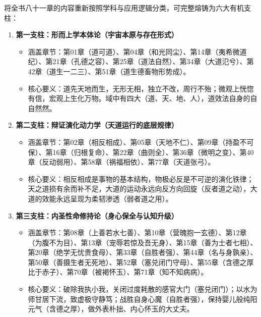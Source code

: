 将全书八十一章的内容重新按照学科与应用逻辑分类，可完整熔铸为六大有机支柱：

\begin{enumerate}
    \item \textbf{第一支柱：形而上学本体论（宇宙本原与存在形式）}
    \begin{itemize}
        \item 涵盖章节：第01章（道可道）、第04章（和光同尘）、第14章（夷希微道纪）、第21章（孔德之容）、第25章（道法自然）、第34章（大道氾兮）、第42章（道生一二三）、第51章（道生德畜物形势成）。
        \item 核心要义：道先天地而生，无形无相，独立不改，周行不殆；微观上恍惚有信，宏观上生化万物。域中有四大（道、天、地、人），道效法自身的自自然然。
    \end{itemize}

    \item \textbf{第二支柱：辩证演化动力学（天道运行的底层规律）}
    \begin{itemize}
        \item 涵盖章节：第02章（相反相成）、第05章（天地不仁）、第09章（持盈不可保）、第16章（归根复命）、第22章（曲则全）、第36章（微明之变）、第40章（反动弱用）、第58章（祸福相依）、第77章（天道张弓）。
        \item 核心要义：相反相成是事物的基本结构，物极必反是不可逆的演化铁律；天之道损有余而补不足，大道的运动永远向反方向回旋（反者道之动），大道的效能永远呈现为柔韧渗透（弱者道之用）。
    \end{itemize}

    \item \textbf{第三支柱：内圣性命修持论（身心保全与认知升级）}
    \begin{itemize}
        \item 涵盖章节：第08章（上善若水七善）、第10章（营魄抱一玄德）、第12章（为腹不为目）、第13章（宠辱若惊及吾无身）、第15章（善为士者七相）、第20章（绝学无忧贵食母）、第33章（自胜者强）、第44章（名与身孰亲）、第50章（善摄生者无死地）、第52章（塞兑闭门守母）、第55章（含德之厚比于赤子）、第70章（被褐怀玉）、第71章（知不知病病）。
        \item 核心要义：破除我执小我，关闭过度耗散的感官大门（塞兑闭门）；以水为师甘居下流，致虚极守静笃；战胜自身心魔（自胜者强），保持婴儿般纯阳元气（含德之厚），做外表朴拙、内心怀玉的大丈夫。
    \end{itemize}


\end{enumerate}
